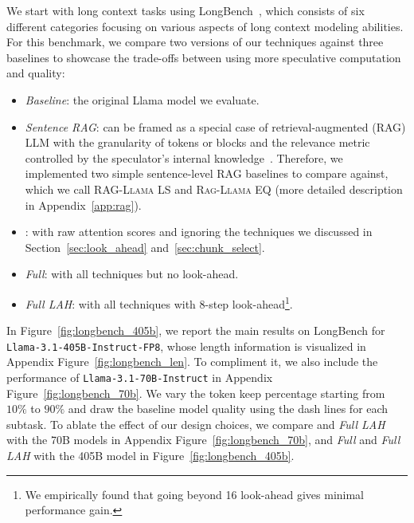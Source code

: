We start with long context tasks using LongBench~\cite{bai2024longbench}, which consists of six different categories focusing on various aspects of long context modeling abilities. For this benchmark, we compare two versions of our techniques against three baselines to showcase the trade-offs between using more speculative computation and quality: 

\begin{itemize}
    \item \textit{Baseline}: the original Llama model we evaluate. 
    \item \textit{Sentence RAG}: \ours{} can be framed as a special case of retrieval-augmented (RAG) LLM with the granularity of tokens or blocks and the relevance metric controlled by the speculator's internal knowledge~\cite{li2024retrievalaugmentedgenerationlongcontext, gao2024retrievalaugmentedgenerationlargelanguage, lewis2021retrievalaugmentedgenerationknowledgeintensivenlp}. Therefore, we implemented two simple sentence-level RAG baselines to compare \ours{} against, which we call \textsc{RAG-Llama LS} and \textsc{Rag-Llama EQ} (more detailed description in Appendix~\ref{app:rag}). 
    \item \textit{\ours{}}: \ours{} with raw attention scores and ignoring the techniques we discussed in Section~\ref{sec:look_ahead} and~\ref{sec:chunk_select}. 
    \item \textit{\ours{} Full}: \ours{} with all techniques but no look-ahead.
    \item \textit{\ours{} Full LAH}: \ours{} with all techniques with 8-step look-ahead\footnote{We empirically found that going beyond 16 look-ahead gives minimal performance gain. }.
\end{itemize}

In Figure~\ref{fig:longbench_405b}, we report the main results on LongBench for \texttt{Llama-3.1-405B-Instruct-FP8}, whose length information is visualized in Appendix Figure~\ref{fig:longbench_len}. To compliment it, we also include the performance of \texttt{Llama-3.1-70B-Instruct} in Appendix Figure~\ref{fig:longbench_70b}. We vary the token keep percentage starting from $10\%$ to $90\%$ and draw the baseline model quality using the dash lines for each subtask. To ablate the effect of our design choices, we compare \textit{\ours{}} and \textit{\ours{} Full LAH} with the 70B models in Appendix Figure~\ref{fig:longbench_70b}, and \textit{\ours{} Full} and \textit{\ours{} Full LAH} with the 405B model in Figure~\ref{fig:longbench_405b}. 

